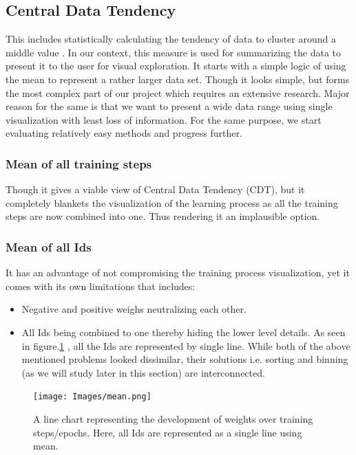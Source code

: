 \documentclass[journal]{vgtc}                %
\begin{document}
\subsection{Central Data Tendency}This includes statistically calculating the tendency of data to cluster around a middle value \cite{cdt}. In our context, this measure is used for summarizing the data to present it to the user for visual exploration. It starts with a simple logic of using the mean to represent a rather larger data set. Though it looks simple, but forms the most complex part of our project which requires an extensive research. Major reason for the same is that we want to present a wide data range using single visualization with least loss of information. For the same purpose, we start evaluating relatively easy methods and progress further.

\subsubsection{Mean of all training steps} Though it gives a viable view of Central Data Tendency (CDT),  but it completely blankets the visualization of the learning process as all the training steps are now combined into one. Thus rendering it an implausible option.

\subsubsection{Mean of all Ids} It has an advantage of not compromising the training process visualization, yet it comes with its own limitations that includes: 

\begin{itemize}
\item Negative and positive weighs neutralizing each other.
\item All Ids being combined to one thereby hiding the lower level details.
			As seen in figure.\ref{fig:mean_all_in_1} , all the Ids are represented by single line. 
While both of the above mentioned problems looked dissimilar, their solutions i.e. sorting and binning (as we will study later in this section) are interconnected. 
\end{itemize}
\begin{figure}
    \texttt{[image: Images/mean.png]}
    \caption{A line chart representing the development of weights over training steps/epochs. Here, all Ids are represented as a single line using mean.}
    \label{fig:mean_all_in_1}
\end{figure}
\end{document}
